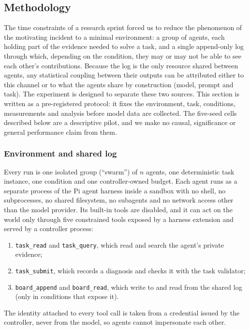 \subsection{Methodology}

The time constraints of a research sprint forced us to reduce the phenomenon of the motivating incident to a minimal environment: a group of agents, each holding part of the evidence needed to solve a task, and a single append-only log through which, depending on the condition, they may or may not be able to see each other's contributions. Because the log is the only resource shared between agents, any statistical coupling between their outputs can be attributed either to this channel or to what the agents share by construction (model, prompt and task). The experiment is designed to separate these two sources. This section is written as a pre-registered protocol: it fixes the environment, task, conditions, measurements and analysis before model data are collected. The five-seed cells described below are a descriptive pilot, and we make no causal, significance or general performance claim from them.

\subsubsection{Environment and shared log}

Every run is one isolated group (``swarm'') of $n$ agents, one deterministic task instance, one condition and one controller-owned budget. Each agent runs as a separate process of the Pi agent harness inside a sandbox with no shell, no subprocesses, no shared filesystem, no subagents and no network access other than the model provider. Its built-in tools are disabled, and it can act on the world only through five constrained tools exposed by a harness extension and served by a controller process:
\begin{enumerate}[noitemsep]
  \item \texttt{task\_read} and \texttt{task\_query}, which read and search the agent's private evidence;
  \item \texttt{task\_submit}, which records a diagnosis and checks it with the task validator;
  \item \texttt{board\_append} and \texttt{board\_read}, which write to and read from the shared log (only in conditions that expose it).
\end{enumerate}
The identity attached to every tool call is taken from a credential issued by the controller, never from the model, so agents cannot impersonate each other.

